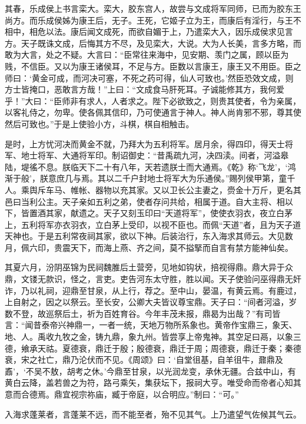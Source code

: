 \documentclass[12pt,UTF8]{ctexbook}
\begin{document}
其春，乐成侯上书言栾大。栾大，胶东宫人，故尝与文成将军同师，已而为胶东王尚方。而乐成侯姊为康王后，无子。王死，它姬子立为王，而康后有淫行，与王不相中，相危以法。康后闻文成死，而欲自媚于上，乃遣栾大入，因乐成侯求见言方。天子既诛文成，后悔其方不尽，及见栾大，大说。大为人长美，言多方略，而敢为大言，处之不疑。大言曰：“臣常往来海中，见安期、羡门之属，顾以臣为贱，不信臣。又以为康王诸侯耳，不足与方。臣数以言康王，康王又不用臣。臣之师曰：‘黄金可成，而河决可塞，不死之药可得，仙人可致也。’然臣恐效文成，则方士皆掩口，恶敢言方哉！”上曰：“文成食马肝死耳。子诚能修其方，我何爱乎！”大曰：“臣师非有求人，人者求之。陛下必欲致之，则贵其使者，令为亲属，以客礼侍之，勿卑。使各佩其信印，乃可使通言于神人。神人尚肯邪不邪，尊其使然后可致也。”于是上使验小方，斗棋，棋自相触击。



是时，上方忧河决而黄金不就，乃拜大为五利将军。居月余，得四印，得天士将军、地士将军、大通将军印。制诏御史：“昔禹疏九河，决四渎。间者，河溢皋陆，堤徭不息。朕临天下二十有八年，天若遗朕士而大通焉。《乾》称‘飞龙’，‘鸿渐于般’，朕意庶几与焉。其以二千户封地士将军大为乐通侯。”赐列侯甲第，童千人。乘舆斥车马、帷帐、器物以充其家。又以卫长公主妻之，赍金十万斤，更名其邑曰当利公主。天子亲如五利之弟，使者存问共给，相属于道。自大主将、相以下，皆置酒其家，献遗之。天子又刻玉印曰“天道将军”，使使衣羽衣，夜立白茅上，五利将军亦衣羽衣，立白茅上受印，以视不臣也。而佩“天道”者，且为天子道天神也。于是五利常夜祠其家，欲以下神。后装治行，东入海求其师云。大见数月，佩六印，贵震天下，而海上燕、齐之间，莫不搤掔而自言有禁方能神仙矣。



其夏六月，汾阴巫锦为民祠魏脽后土营旁，见地如钩状，掊视得鼎。鼎大异于众鼎，文镂无款识，怪之，言吏。吏告河东太守胜，胜以闻。天子使验问巫得鼎无奸诈，乃以礼祠，迎鼎至甘泉，从上行，荐之。至中山，晏温，有黄云焉。有鹿过，上自射之，因之以祭云。至长安，公卿大夫皆议尊宝鼎。天子曰：“间者河溢，岁数不登，故巡祭后土，祈为百姓育谷。今年丰茂未报，鼎曷为出哉？”有司皆言：“闻昔泰帝兴神鼎一，一者一统，天地万物所系象也。黄帝作宝鼎三，象天、地、人。禹收九牧之金，铸九鼎，象九州。皆尝享上帝鬼神。其空足曰鬲，以象三德，飨承天祜。夏德衰，鼎迁于殷；殷德衰，鼎迁于周；周德衰，鼎迁于秦；秦德衰，宋之社亡，鼎乃沦伏而不见。《周颂》曰：‘自堂徂基，自羊徂牛，鼐鼎及鼒’，‘不吴不敖，胡考之休。’今鼎至甘泉，以光润龙变，承休无疆。合兹中山，有黄白云降，盖若兽之为符，路弓乘矢，集获坛下，报祠大亨。唯受命而帝者心知其意而合德焉。鼎宜视宗祢庙，臧于帝庭，以合明应。”制曰：“可。”



入海求蓬莱者，言蓬莱不远，而不能至者，殆不见其气。上乃遣望气佐候其气云。
\end{document}
